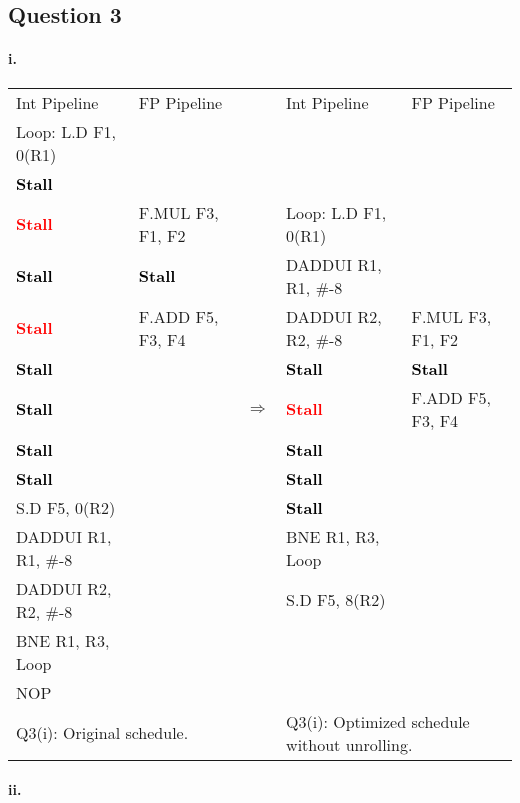 \documentclass[11pt]{article}
\newcommand{\q}[1]{\subsection*{Question {#1}}}
\renewcommand{\part}[1]{\paragraph*{{#1}.}}
\newcommand{\code}[1]{\textsf{#1}}
\newcommand{\stall}{\textcolor{red}{\textbf{Stall}}}
\newcommand{\cellstall}{\cellcolor{red!25}\textcolor{black}{\textbf{Stall}}}
\begin{document}
\q{3} 
\part{i} 

\begin{table}[h]
\begin{tabular}{llcll}
	 Int Pipeline & FP Pipeline & & Int Pipeline & FP Pipeline \\
	 \code{Loop:} \code{L.D F1, 0(R1)} &  & & & \\
	 \cellstall &  & & & \\
	 \stall & \code{F.MUL F3, F1, F2} & & \code{Loop:} \code{L.D F1, 0(R1)} &  \\
	 \cellstall & \cellstall & & \code{DADDUI R1, R1, \#-8} &  \\
	 \stall & \code{F.ADD F5, F3, F4} & & \code{DADDUI R2, R2, \#-8} & \code{F.MUL F3, F1, F2} \\
	 \cellstall &  & & \cellstall & \cellstall \\
	 \cellstall &  & $\Rightarrow$ & \stall & \code{F.ADD F5, F3, F4} \\
	 \cellstall &  & & \cellstall &  \\
	 \cellstall &  & &  \cellstall &   \\
	 \code{S.D F5, 0(R2)} &  & & \cellstall &  \\
	 \code{DADDUI R1, R1, \#-8} &  & &  \code{BNE R1, R3, Loop} &  \\
	 \code{DADDUI R2, R2, \#-8} &  & &  \code{S.D F5, 8(R2)} &  \\
	 \code{BNE R1, R3, Loop}  &  & &  &  \\
	 \code{NOP} &  & & & \\
	 \multicolumn{2}{l}{Q3(i): Original schedule.} & & \multicolumn{2}{l}{Q3(i): Optimized schedule without unrolling.} 
\end{tabular}
\label{tbl:q3-p1}
\end{table}


\part{ii} 
\end{document}
